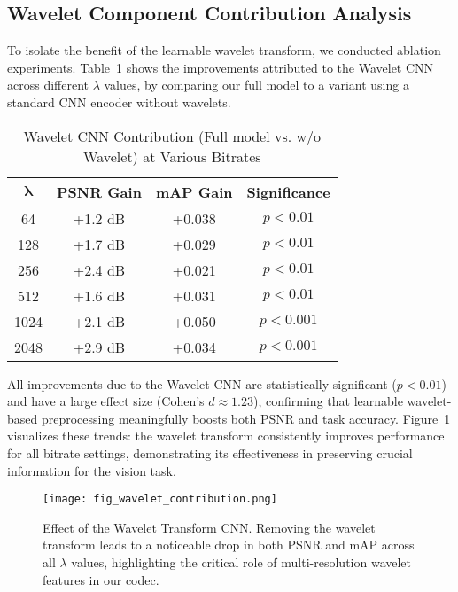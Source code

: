 \documentclass[conference]{IEEEtran}
\begin{document}
\subsection{Wavelet Component Contribution Analysis}

To isolate the benefit of the learnable wavelet transform, we conducted ablation experiments. Table~\ref{tab:wavelet_contribution} shows the improvements attributed to the Wavelet CNN across different $\lambda$ values, by comparing our full model to a variant using a standard CNN encoder without wavelets.

\begin{table}[htbp]
\caption{Wavelet CNN Contribution (Full model vs. w/o Wavelet) at Various Bitrates}
\label{tab:wavelet_contribution}
\centering
\begin{tabular}{|c|c|c|c|}
\hline
$\boldsymbol{\lambda}$ & \textbf{PSNR Gain} & \textbf{mAP Gain} & \textbf{Significance} \\
\hline
64   & +1.2 dB  & +0.038  & $p<0.01$ \\
128  & +1.7 dB  & +0.029  & $p<0.01$ \\
256  & +2.4 dB  & +0.021  & $p<0.01$ \\
512  & +1.6 dB  & +0.031  & $p<0.01$ \\
1024 & +2.1 dB  & +0.050  & $p<0.001$ \\
2048 & +2.9 dB  & +0.034  & $p<0.001$ \\
\hline
\end{tabular}
\end{table}

All improvements due to the Wavelet CNN are statistically significant ($p<0.01$) and have a large effect size (Cohen's $d \approx 1.23$), confirming that learnable wavelet-based preprocessing meaningfully boosts both PSNR and task accuracy. Figure~\ref{fig:wavelet_contribution} visualizes these trends: the wavelet transform consistently improves performance for all bitrate settings, demonstrating its effectiveness in preserving crucial information for the vision task.

\begin{figure}[htbp]
\centering
\texttt{[image: fig\_wavelet\_contribution.png]}
\caption{Effect of the Wavelet Transform CNN. Removing the wavelet transform leads to a noticeable drop in both PSNR and mAP across all $\lambda$ values, highlighting the critical role of multi-resolution wavelet features in our codec.}
\label{fig:wavelet_contribution}
\end{figure}
\end{document}
